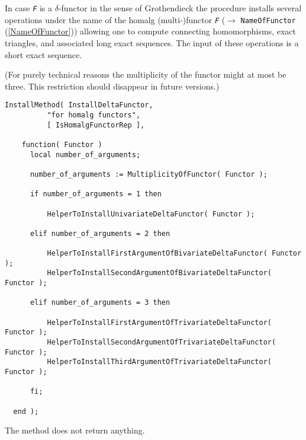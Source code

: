 \documentclass[a4paper,11pt]{report}
\begin{document}
{{{ In case \mbox{\texttt{\mdseries\slshape F}} is a $\delta$-functor in the sense of Grothendieck the procedure installs several
operations under the name of the \textsf{homalg} (multi-)functor \mbox{\texttt{\mdseries\slshape F}} ($\to$ \texttt{NameOfFunctor} (\ref{NameOfFunctor})) allowing one to compute connecting homomorphisms, exact triangles, and
associated long exact sequences. The input of these operations is a short
exact sequence. 

 (For purely technical reasons the multiplicity of the functor might at most be
three. This restriction should disappear in future versions.) 
\begin{Verbatim}[fontsize=\small,frame=single,label=Code]
  InstallMethod( InstallDeltaFunctor,
          "for homalg functors",
          [ IsHomalgFunctorRep ],
          
    function( Functor )
      local number_of_arguments;
      
      number_of_arguments := MultiplicityOfFunctor( Functor );
      
      if number_of_arguments = 1 then
          
          HelperToInstallUnivariateDeltaFunctor( Functor );
          
      elif number_of_arguments = 2 then
          
          HelperToInstallFirstArgumentOfBivariateDeltaFunctor( Functor );
          HelperToInstallSecondArgumentOfBivariateDeltaFunctor( Functor );
          
      elif number_of_arguments = 3 then
          
          HelperToInstallFirstArgumentOfTrivariateDeltaFunctor( Functor );
          HelperToInstallSecondArgumentOfTrivariateDeltaFunctor( Functor );
          HelperToInstallThirdArgumentOfTrivariateDeltaFunctor( Functor );
          
      fi;
      
  end );
\end{Verbatim}
 The method does not return anything. }

 }

  }

   
\end{document}
